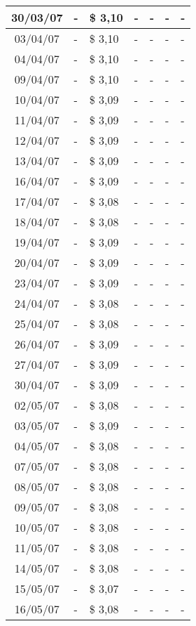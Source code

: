 \begin{center}
\begin{longtable}{|c|p{1.5cm}|p{1.5cm}|p{1.5cm}|p{1.5cm}|p{1.5cm}|p{1.5cm}|}
30/03/07 & - & \$ 3,10 & - & - & - & - \\ \hline
03/04/07 & - & \$ 3,10 & - & - & - & - \\ \hline
04/04/07 & - & \$ 3,10 & - & - & - & - \\ \hline
09/04/07 & - & \$ 3,10 & - & - & - & - \\ \hline
10/04/07 & - & \$ 3,09 & - & - & - & - \\ \hline
11/04/07 & - & \$ 3,09 & - & - & - & - \\ \hline
12/04/07 & - & \$ 3,09 & - & - & - & - \\ \hline
13/04/07 & - & \$ 3,09 & - & - & - & - \\ \hline
16/04/07 & - & \$ 3,09 & - & - & - & - \\ \hline
17/04/07 & - & \$ 3,08 & - & - & - & - \\ \hline
18/04/07 & - & \$ 3,08 & - & - & - & - \\ \hline
19/04/07 & - & \$ 3,09 & - & - & - & - \\ \hline
20/04/07 & - & \$ 3,09 & - & - & - & - \\ \hline
23/04/07 & - & \$ 3,09 & - & - & - & - \\ \hline
24/04/07 & - & \$ 3,08 & - & - & - & - \\ \hline
25/04/07 & - & \$ 3,08 & - & - & - & - \\ \hline
26/04/07 & - & \$ 3,09 & - & - & - & - \\ \hline
27/04/07 & - & \$ 3,09 & - & - & - & - \\ \hline
30/04/07 & - & \$ 3,09 & - & - & - & - \\ \hline
02/05/07 & - & \$ 3,08 & - & - & - & - \\ \hline
03/05/07 & - & \$ 3,09 & - & - & - & - \\ \hline
04/05/07 & - & \$ 3,08 & - & - & - & - \\ \hline
07/05/07 & - & \$ 3,08 & - & - & - & - \\ \hline
08/05/07 & - & \$ 3,08 & - & - & - & - \\ \hline
09/05/07 & - & \$ 3,08 & - & - & - & - \\ \hline
10/05/07 & - & \$ 3,08 & - & - & - & - \\ \hline
11/05/07 & - & \$ 3,08 & - & - & - & - \\ \hline
14/05/07 & - & \$ 3,08 & - & - & - & - \\ \hline
15/05/07 & - & \$ 3,07 & - & - & - & - \\ \hline
16/05/07 & - & \$ 3,08 & - & - & - & - \\ \hline

\end{longtable}
\end{center}
